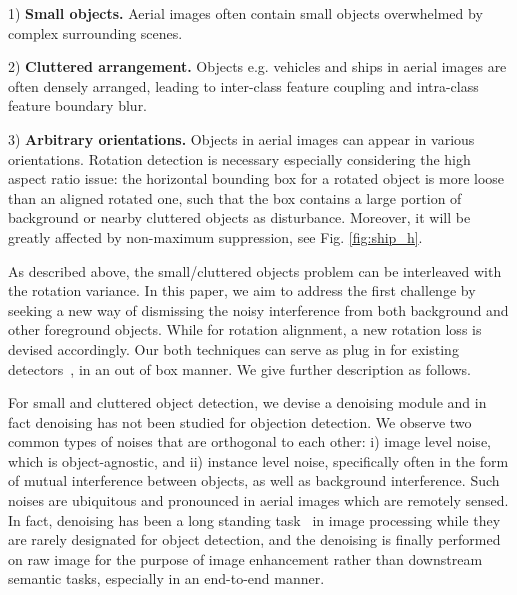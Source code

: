 \documentclass[10pt,journal,compsoc]{IEEEtran}
\begin{document}
1) \textbf{Small objects.} Aerial images often contain small objects overwhelmed by complex surrounding scenes.

2) \textbf{Cluttered arrangement.} Objects e.g. vehicles and ships in aerial images are often densely arranged, leading to inter-class feature coupling and intra-class feature boundary blur.

3) \textbf{Arbitrary orientations.} Objects in aerial images can appear in various orientations. Rotation detection is necessary especially considering the high aspect ratio issue: the horizontal bounding box for a rotated object is more loose than an aligned rotated one, such that the box contains a large portion of background or nearby cluttered objects as disturbance. Moreover, it will be greatly affected by non-maximum suppression, see Fig. \ref{fig:ship_h}.
  
As described above, the small/cluttered objects problem can be interleaved with the rotation variance. In this paper, we aim to address the first challenge by seeking a new way of dismissing the noisy interference from both background and other foreground objects. While for rotation alignment, a new rotation loss is devised accordingly. Our both techniques can serve as plug in for existing detectors~\cite{ren2017faster, lin2017feature, lin2017focal, ma2018arbitrary, jiang2017r2cnn,  yang2021r3det}, in an out of box manner. We give further description as follows.

For small and cluttered object detection, we devise a denoising module and in fact denoising has not been studied for objection detection. We observe two common types of noises that are orthogonal to each other: i) image level noise, which is object-agnostic, and ii) instance level noise, specifically often in the form of mutual interference between objects, as well as background interference. Such noises are ubiquitous and pronounced in aerial images which are remotely sensed. In fact, denoising has been a long standing task~\cite{tian2020deep,xie2019feature,milani2012adaptive,cho2020dapas} in image processing while they are rarely designated for object detection, and the denoising is finally performed on raw image for the purpose of image enhancement rather than downstream semantic tasks, especially in an end-to-end manner.
\end{document}
